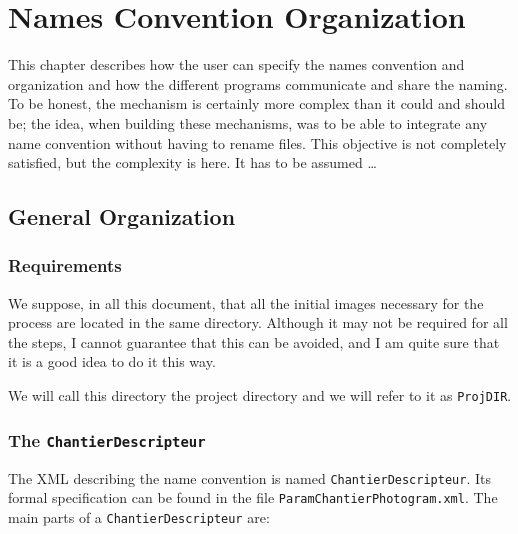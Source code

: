 \chapter{Names Convention Organization}

This chapter describes how the user can specify the names convention
and organization and how the different programs communicate
and share the naming. To be honest, the mechanism is certainly more
complex than it could and should be; the idea, when building these
mechanisms, was to be able to integrate any name convention without having
to rename files. This objective is not completely satisfied, but the
complexity is here. It has to be assumed \dots



\label{Chap:NFS}


\section{General Organization}

\subsection{Requirements}

We suppose, in all this document, that all the initial images necessary
for the process are located in the same directory. Although it may
not be required for all the steps, I cannot guarantee that this can be avoided,
and I am quite sure that it is a good idea to do it this way.

We will call this directory the project directory and
we will refer to it as {\tt ProjDIR}.


\subsection{The  {\tt ChantierDescripteur}}

The XML  describing the name convention is named {\tt ChantierDescripteur}.
Its formal specification can be found in the file {\tt ParamChantierPhotogram.xml}.
The main parts of a {\tt ChantierDescripteur}  are:

